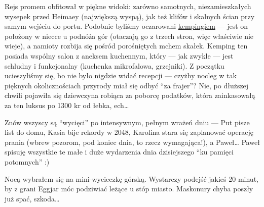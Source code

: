 
Rejs promem obfitował w piękne widoki: zarówno samotnych, niezamieszkałych wysepek przed Heimaey (największą wyspą), jak też klifów i skalnych ścian przy samym wejściu do portu. Podobnie byliśmy oczarowani \href{http://www.tjalda.is/en/herjolfsdalur/}{kempingiem} --- jest on położony w niecce u podnóża gór (otaczają go z trzech stron, więc właściwie nie wieje), a namioty rozbija się pośród porośniętych mchem skałek. Kemping ten posiada wspólny salon z aneksem kuchennym, który --- jak zwykle --- jest schludny i funkcjonalny (kuchenka mikrofalowa, grzejniki). Z początku ucieszyliśmy się, bo nie było nigdzie widać recepcji --- czyżby nocleg w tak pięknych okolicznościach przyrody miał się odbyć “za frajer”? Nie, po dłuższej chwili pojawiła się dziewczyna robiąca za poborcę podatków, która zainkasowałą za ten luksus po 1300 kr od łebka, ech…


Znów wszyscy są “wycięci” po intensywnym, pełnym wrażeń dniu --- Put pisze list do domu, Kasia bije rekordy w 2048, Karolina stara się zaplanować operację prania (wbrew pozorom, pod koniec dnia, to rzecz wymagająca!), a Paweł… Paweł spisuję wszystkie te małe i duże wydarzenia dnia dzisiejszego “ku pamięci potomnych” :)

Nocą wybrałem się na mini-wycieczkę górską. Wystarczy podejść jakieś 20 minut, by z grani Eggjar móc podziwiać leżące u stóp miasto. Maskonury chyba poszły już spać, szkoda…